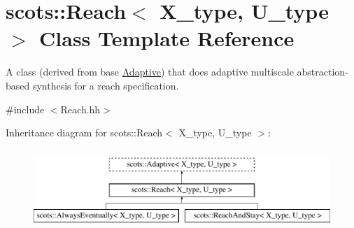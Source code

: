 \hypertarget{classscots_1_1Reach}{}\section{scots\+:\+:Reach$<$ X\+\_\+type, U\+\_\+type $>$ Class Template Reference}
\label{classscots_1_1Reach}


A class (derived from base \hyperlink{classscots_1_1Adaptive}{Adaptive}) that does adaptive multiscale abstraction-\/based synthesis for a reach specification.  




{\ttfamily \#include $<$Reach.\+hh$>$}

Inheritance diagram for scots\+:\+:Reach$<$ X\+\_\+type, U\+\_\+type $>$\+:\begin{figure}[H]
\begin{center}
\leavevmode
\includegraphics[height=3.000000cm]{classscots_1_1Reach}
\end{center}
\end{figure}
